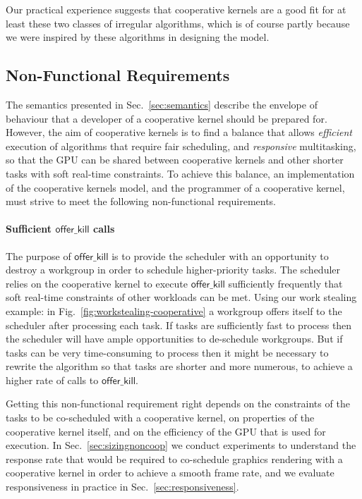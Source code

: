 \documentclass[numbers,nocopyrightspace,10pt]{sigplanconf}
\newcommand{\myfig}{Fig.~}
\newcommand{\mysec}{Sec.~}
\newcommand{\offerkill}{\mathsf{offer\_kill}}
\begin{document}
Our practical experience suggests that cooperative kernels are a good
fit for at least these two classes of irregular algorithms, which is
of course partly because we were inspired by these algorithms in
designing the model.


\subsection{Non-Functional Requirements}\label{sec:nonfunctional}

The semantics presented in \mysec\ref{sec:semantics} describe the envelope of
behaviour that a developer of a cooperative kernel should be prepared
for.
%
However, the aim of cooperative kernels is to find a balance that
allows \emph{efficient} execution of algorithms that require fair scheduling, and
\emph{responsive} multitasking, so that the GPU can be shared between
cooperative kernels and other shorter tasks with soft real-time constraints.
%
To achieve this balance, an implementation of the cooperative
kernels model, and the programmer of a cooperative kernel, must strive
to meet the following non-functional requirements.

\paragraph{Sufficient $\offerkill$ calls}

The purpose of $\offerkill$ is to provide the scheduler with an
opportunity to destroy a workgroup in order to schedule
higher-priority tasks.  The scheduler relies on the cooperative kernel
to execute $\offerkill$ sufficiently frequently that soft real-time
constraints of other workloads can be met.
%
Using our work stealing example: in
\myfig\ref{fig:workstealing-cooperative} a workgroup offers itself to
the scheduler after processing each task.  If tasks are sufficiently
fast to process then the scheduler will have ample opportunities to
de-schedule workgroups.  But if tasks can be very time-consuming to
process then it might be necessary to rewrite the algorithm so that
tasks are shorter and more numerous, to achieve a higher rate of calls
to $\offerkill$.

Getting this non-functional requirement right depends on the
constraints of the tasks to be co-scheduled with a cooperative kernel,
on properties of the cooperative kernel itself, and on the efficiency
of the GPU that is used for execution.  In \mysec\ref{sec:sizingnoncoop} we conduct
experiments to understand the response rate that would be required to
co-schedule graphics rendering with a cooperative kernel in order to
achieve a smooth frame rate, and we evaluate responsiveness in
practice in \mysec\ref{sec:responsiveness}.
\end{document}
